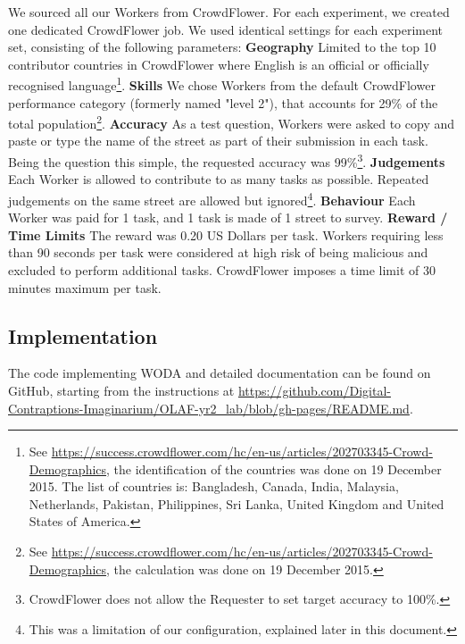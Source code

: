 We sourced all our Workers from CrowdFlower. For each experiment, we created one dedicated CrowdFlower job. We used identical settings for each experiment set, consisting of the following parameters: \textbf{Geography} Limited to the top 10 contributor countries in CrowdFlower where English is an official or officially recognised language\footnote{See \url{https://success.crowdflower.com/hc/en-us/articles/202703345-Crowd-Demographics}, the identification of the countries was done on 19 December 2015. The list of countries is: Bangladesh, Canada, India, Malaysia, Netherlands, Pakistan, Philippines, Sri Lanka, United Kingdom and United States of America.}. \textbf{Skills} We chose Workers from the default CrowdFlower performance category (formerly named "level 2"), that accounts for 29\% of the total population\footnote{See \url{https://success.crowdflower.com/hc/en-us/articles/202703345-Crowd-Demographics}, the calculation was done on 19 December 2015.}. \textbf{Accuracy} As a test question, Workers were asked to copy and paste or type the name of the street as part of their submission in each task. Being the question this simple, the requested accuracy was 99\%\footnote{CrowdFlower does not allow the Requester to set target accuracy to 100\%.}. \textbf{Judgements} Each Worker is allowed to contribute to as many tasks as possible. Repeated judgements on the same street are allowed but ignored\footnote{This was a limitation of our configuration, explained later in this document.}. \textbf{Behaviour} Each Worker was paid for 1 task, and 1 task is made of 1 street to survey. \textbf{Reward / Time Limits} The reward was 0.20 US Dollars per task. Workers requiring less than 90 seconds per task were considered at high risk of being malicious and excluded to perform additional tasks. CrowdFlower imposes a time limit of 30 minutes maximum per task.

\subsection{Implementation}

\begin{sloppypar} %
The code implementing WODA and detailed documentation can be found on GitHub, starting from the instructions at \url{https://github.com/Digital-Contraptions-Imaginarium/OLAF-yr2_lab/blob/gh-pages/README.md}.
\end{sloppypar}